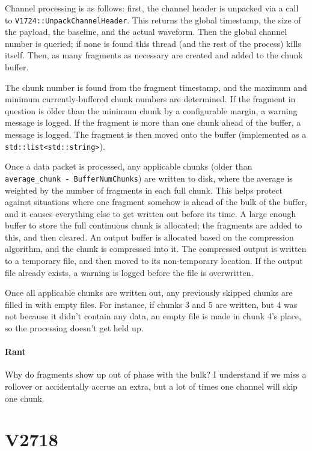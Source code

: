 Channel processing is as follows: first, the channel header is unpacked via a call to \texttt{V1724::UnpackChannelHeader}.
This returns the global timestamp, the size of the payload, the baseline, and the actual waveform.
Then the global channel number is queried; if none is found this thread (and the rest of the process) kills itself.
Then, as many fragments as necessary are created and added to the chunk buffer.

The chunk number is found from the fragment timestamp, and the maximum and minimum currently-buffered chunk numbers are determined.
If the fragment in question is older than the minimum chunk by a configurable margin, a warning message is logged.
If the fragment is more than one chunk ahead of the buffer, a message is logged.
The fragment is then moved onto the buffer (implemented as a \texttt{std::list<std::string>}).

Once a data packet is processed, any applicable chunks (older than \texttt{average\_chunk - BufferNumChunks}) are written to disk, where the average is weighted by the number of fragments in each full chunk.
This helps protect against situations where one fragment somehow is ahead of the bulk of the buffer, and it causes everything else to get written out before its time.
A large enough buffer to store the full continuous chunk is allocated; the fragments are added to this, and then cleared.
An output buffer is allocated based on the compression algorithm, and the chunk is compressed into it.
The compressed output is written to a temporary file, and then moved to its non-temporary location.
If the output file already exists, a warning is logged before the file is overwritten.

Once all applicable chunks are written out, any previously skipped chunks are filled in with empty files.
For instance, if chunks 3 and 5 are written, but 4 was not because it didn't contain any data, an empty file is made in chunk 4's place, so the processing doesn't get held up.

\paragraph{Rant}

Why do fragments show up out of phase with the bulk?
I understand if we miss a rollover or accidentally accrue an extra, but a lot of times one channel will skip one chunk.

\section{V2718}


